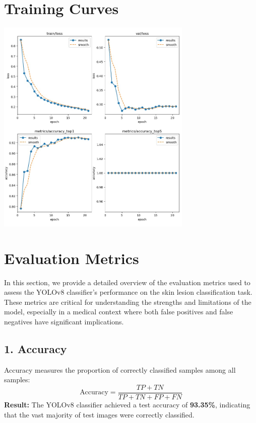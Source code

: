 \documentclass[a4paper,12pt]{report}
\begin{document}
\begin{spacing}{1.5}
    \section{Training Curves}
    \begin{center}
        \includegraphics[width=0.7\textwidth]{Pics/results.jpg}
    \end{center}

    \section{Evaluation Metrics}

    In this section, we provide a detailed overview of the evaluation metrics used to assess the YOLOv8 classifier's performance on the skin lesion classification task. These metrics are critical for understanding the strengths and limitations of the model, especially in a medical context where both false positives and false negatives have significant implications.

    \subsection*{1. Accuracy}
    Accuracy measures the proportion of correctly classified samples among all samples:
    \[
        \text{Accuracy} = \frac{TP + TN}{TP + TN + FP + FN}
    \]
    \textbf{Result:} The YOLOv8 classifier achieved a test accuracy of \textbf{93.35\%}, indicating that the vast majority of test images were correctly classified.


\end{spacing}
\end{document}
